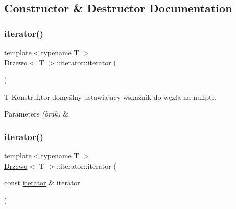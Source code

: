 \subsection{Constructor \& Destructor Documentation}
\mbox{\label{class_drzewo_1_1iterator_a279751514e51594342daa7a7ed501a38}} 
\subsubsection{\texorpdfstring{iterator()}{iterator()}\hspace{0.1cm}{\footnotesize\ttfamily [1/2]}}
{\footnotesize\ttfamily template$<$typename T $>$ \\
\hyperlink{class_drzewo}{Drzewo}$<$ T $>$\+::iterator\+::iterator (\begin{DoxyParamCaption}{ }\end{DoxyParamCaption})\hspace{0.3cm}{\ttfamily [inline]}}

T Konstruktor domyślny ustawiający wskaźnik do węzła na \textquotesingle{}nullptr\textquotesingle{}.


\begin{DoxyParams}{Parameters}
{\em (brak)} & \\
\hline
\end{DoxyParams}
\mbox{\label{class_drzewo_1_1iterator_a627d8a55a11ad8be75493634c6fe07b2}} 
\subsubsection{\texorpdfstring{iterator()}{iterator()}\hspace{0.1cm}{\footnotesize\ttfamily [2/2]}}
{\footnotesize\ttfamily template$<$typename T $>$ \\
\hyperlink{class_drzewo}{Drzewo}$<$ T $>$\+::iterator\+::iterator (\begin{DoxyParamCaption}\item[{const \hyperlink{class_drzewo_1_1iterator}{iterator} \&}]{iterator }\end{DoxyParamCaption})\hspace{0.3cm}{\ttfamily [inline]}}

